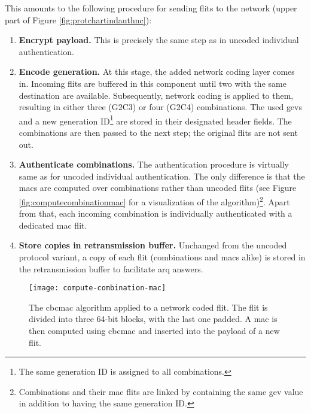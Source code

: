 This amounts to the following procedure for sending flits to the network (upper part of Figure \ref{fig:protchartindauthnc}):
\begin{enumerate}
    \item \textbf{Encrypt payload.} This is precisely the same step as in uncoded individual authentication.
    \item \textbf{Encode generation.} At this stage, the added network coding layer comes in. Incoming flits are buffered in this component until two
        with the same destination are available. Subsequently, network coding is applied to them, resulting in either three (G2C3) or four (G2C4)
        combinations. The used \glspl{gev} and a new generation ID\footnote{The same generation ID is assigned to all combinations.} are stored in
        their designated header fields. The combinations are then passed to the next step; the original flits are not sent out.
    \item \textbf{Authenticate combinations.} The authentication procedure is virtually same as for uncoded individual authentication. The only
        difference is that the \glspl{mac} are computed over combinations rather than uncoded flits (see Figure \vref{fig:computecombinationmac}
        for a visualization of the algorithm)\footnote{Combinations and their \gls{mac} flits are linked by containing the same \gls{gev} value in
        addition to having the same generation ID.}. Apart from that, each incoming combination is individually authenticated with a dedicated \gls{mac}
        flit.
    \item \textbf{Store copies in retransmission buffer.} Unchanged from the uncoded protocol variant, a copy of each flit (combinations and
        \glspl{mac} alike) is stored in the retransmission buffer to facilitate \gls{arq} answers.
\end{enumerate}
\vspace{0.5\baselineskip}

\begin{figure}
    \centering
    \texttt{[image: compute-combination-mac]}
    \caption[CBC-MAC algorithm applied to a network coded flit]{The \gls{cbcmac} algorithm applied to a network coded flit. The flit is divided into three
    64-bit blocks, with the last one padded. A \gls{mac} is then computed using \gls{cbcmac} and inserted into the payload of a new flit.}
    \label{fig:computecombinationmac}
\end{figure}

